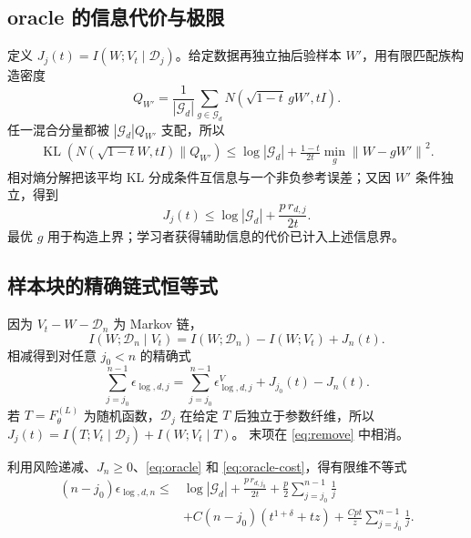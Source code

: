 \documentclass[a4paper]{tufte-handout}
\newcommand{\norm}[1]{\left\|#1\right\|}
\DeclareMathOperator{\KL}{KL}
\begin{document}
\begin{fullwidth}
\section{oracle 的信息代价与极限}
定义 $J_j(t)=I(W;V_t\mid \mathcal D_j)$。给定数据再独立抽后验样本 $W'$，用有限匹配族构造密度
\[
Q_{W'}=\frac1{|\mathcal G_d|}\sum_{g\in\mathcal G_d}
N(\sqrt{1-t}\,gW',tI).
\]
任一混合分量都被 $|\mathcal G_d|Q_{W'}$ 支配，所以
\begin{equation}\begin{aligned}
\KL(N(\sqrt{1-t}W,tI)\|Q_{W'})
\le\log|\mathcal G_d|+\frac{1-t}{2t}\min_g\norm{W-gW'}^2.
\end{aligned}\end{equation}
相对熵分解把该平均 KL 分成条件互信息与一个非负参考误差；又因 $W'$ 条件独立，得到
\begin{equation}\label{eq:oracle-cost}
J_j(t)\le\log|\mathcal G_d|+\frac{p\,r_{d,j}}{2t}.
\end{equation}
最优 $g$ 用于构造上界；学习者获得辅助信息的代价已计入上述信息界。

\subsection{样本块的精确链式恒等式}
因为 $V_t-W-\mathcal D_n$ 为 Markov 链，
\[
I(W;\mathcal D_n\mid V_t)=I(W;\mathcal D_n)-I(W;V_t)+J_n(t).
\]
相减得到对任意 $j_0<n$ 的精确式
\begin{equation}\label{eq:remove}
\sum_{j=j_0}^{n-1}\epsilon_{\log,d,j}
=\sum_{j=j_0}^{n-1}\epsilon^V_{\log,d,j}+J_{j_0}(t)-J_n(t).
\end{equation}
若 $T=F_\theta^{(L)}$ 为随机函数，$\mathcal D_j$ 在给定 $T$ 后独立于参数纤维，所以
$J_j(t)=I(T;V_t\mid \mathcal D_j)+I(W;V_t\mid T)$。
末项在 \eqref{eq:remove} 中相消。

利用风险递减、$J_n\ge0$、\eqref{eq:oracle} 和 \eqref{eq:oracle-cost}，得有限维不等式
\begin{equation}\label{eq:block}\begin{aligned}
(n-j_0)\epsilon_{\log,d,n}\le{}&\log|\mathcal G_d|+\frac{p\,r_{d,j_0}}{2t}
+\frac p2\sum_{j=j_0}^{n-1}\frac1j\\
&+C(n-j_0)(t^{1+\delta}+tz)
+\frac{Cpt}{z}\sum_{j=j_0}^{n-1}\frac1j.
\end{aligned}\end{equation}


\end{fullwidth}
\end{document}
